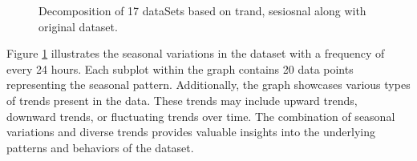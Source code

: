 \documentclass[a4paper,fleqn]{cas-dc}
\begin{document}
\begin{itemize}
\begin{figure}[h!]
  \centering
  \caption{Decomposition of 17 dataSets based on trand, sesiosnal along with original dataset.}
  \label{Eda}
\end{figure}
Figure \ref{Eda} illustrates the seasonal variations in the dataset with a frequency of every 24 hours. Each subplot within the graph contains 20 data points representing the seasonal pattern. Additionally, the graph showcases various types of trends present in the data. These trends may include upward trends, downward trends, or fluctuating trends over time. The combination of seasonal variations and diverse trends provides valuable insights into the underlying patterns and behaviors of the dataset.
\end{itemize}
\end{document}
